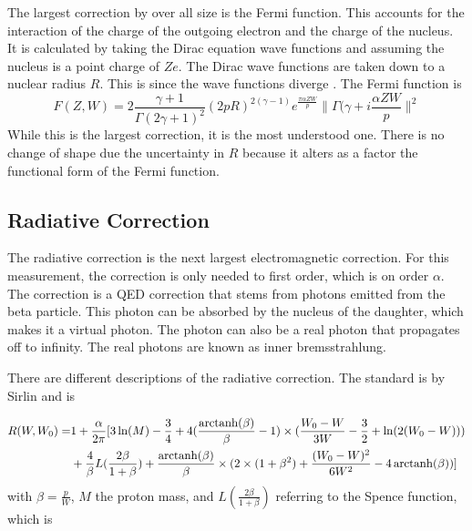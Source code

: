 \documentclass[../MaxHughesThesis.tex]{subfiles}
\begin{document}
The largest correction by over all size is the Fermi function.
This accounts for the interaction of the charge of the outgoing electron and the charge of the nucleus.
It is calculated by taking the Dirac equation wave functions and assuming the nucleus is a point charge of $Ze$.
The Dirac wave functions are taken down to a nuclear radius $R$.
This is since the wave functions diverge \cite{Wil89}.
The Fermi function is %
\begin{equation}
	F(Z,W) = 2\frac{\gamma + 1}{\Gamma(2\gamma +1)^{2}}(2pR)^{2(\gamma - 1)}e^{\frac{\pi\alpha ZW}{p}}\|\Gamma(\gamma + i\frac{\alpha ZW}{p}\|^{2}
	\label{eq:fermifunc}
\end{equation}
While this is the largest correction, it is the most understood one.
There is no change of shape due the uncertainty in $R$ because it alters as a factor the functional form of the Fermi function. 

\subsection{Radiative Correction}
The radiative correction is the next largest electromagnetic correction.
For this measurement, the correction is only needed to first order, which is on order $\alpha$.
The correction is a QED correction that stems from photons emitted from the beta particle.
This photon can be absorbed by the nucleus of the daughter, which makes it a virtual photon.
The photon can also be a real photon that propagates off to infinity.
The real photons are known as inner bremsstrahlung.

There are different descriptions of the radiative correction.  
The standard is by Sirlin \cite{Sir67} and is %

\begin{equation}
	\label{eq:sirlinrad}
	\begin{split}
	R(W,W_{0}) = & 1 + \frac{\alpha}{2\pi}[3\ln(M) - \frac{3}{4} + 4(\frac{\operatorname{arctanh}(\beta)}{\beta} - 1)\times(\frac{W_{0} - W}{3W} - \frac{3}{2} + \ln(2(W_{0} - W))) \\
	 & + \frac{4}{\beta}L(\frac{2\beta}{1 + \beta}) + \frac{\operatorname{arctanh}(\beta)}{\beta}\times(2\times(1 + \beta^{2}) + \frac{(W_{0} - W)^{2}}{6W^{2}} - 4 \operatorname{arctanh}(\beta))]
	\end{split}
\end{equation} 
with $\beta = \frac{p}{W}$, $M$ the proton mass, and $L(\frac{2\beta}{1+\beta})$ referring to the Spence function, which is \cite{Wil95} %
\end{document}
